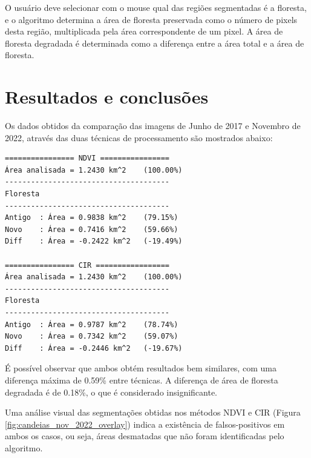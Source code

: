 \documentclass[11pt]{article}
\begin{document}
O usuário deve selecionar com o mouse qual das regiões segmentadas é a floresta, e o algoritmo determina a área de floresta preservada como o número de pixels desta região, multiplicada pela área correspondente de um pixel. A área de floresta degradada é determinada como a diferença entre a área total e a área de floresta.

\section{Resultados e conclusões}

Os dados obtidos da comparação das imagens de Junho de 2017 e Novembro de 2022, através das duas técnicas de processamento são mostrados abaixo:

\begin{verbatim}
================ NDVI ================
Área analisada = 1.2430 km^2 	(100.00%)
--------------------------------------
Floresta
--------------------------------------
Antigo  : Área = 0.9838 km^2 	(79.15%)
Novo    : Área = 0.7416 km^2 	(59.66%)
Diff    : Área = -0.2422 km^2 	(-19.49%)

================ CIR =================
Área analisada = 1.2430 km^2 	(100.00%)
--------------------------------------
Floresta
--------------------------------------
Antigo  : Área = 0.9787 km^2 	(78.74%)
Novo    : Área = 0.7342 km^2 	(59.07%)
Diff    : Área = -0.2446 km^2 	(-19.67%)
\end{verbatim}

É possível observar que ambos obtém resultados bem similares, com uma diferença máxima de 0.59\% entre técnicas. A diferença de área de floresta degradada é de 0.18\%, o que é considerado insignificante.

Uma análise visual das segmentações obtidas nos métodos NDVI e CIR (Figura \ref{fig:candeias_nov_2022_overlay}) indica a existência de falsos-positivos em ambos os casos, ou seja, áreas desmatadas que não foram identificadas pelo algoritmo.
\end{document}
